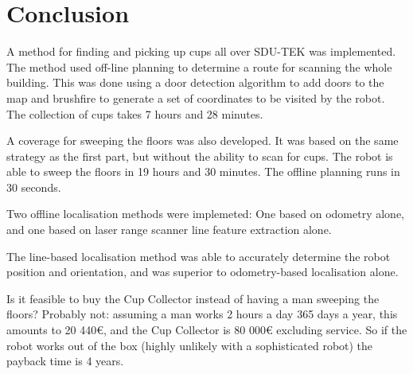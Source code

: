 \section{Conclusion}
\label{sec:conclusion}
A method for finding and picking up cups all over SDU-TEK was implemented. The method used off-line planning to determine a route for scanning the whole building. 
This was done using a door detection algorithm to add doors to the map and brushfire to generate a set of coordinates to be visited by the robot.
The collection of cups takes 7 hours and 28 minutes.

A coverage for sweeping the floors was also developed. It was based on the same strategy as the first part, but without the ability to scan for cups. The robot is able to sweep the floors in 19 hours and 30 minutes. The offline planning runs in 30 seconds. 

Two offline localisation methods were implemeted:
One based on odometry alone, and one based on laser range scanner line feature extraction alone.

The line-based localisation method was able to accurately determine the robot position and orientation,
and was superior to odometry-based localisation alone.

Is it feasible to buy the Cup Collector instead of having a man sweeping the floors?
Probably not: assuming a man works 2 hours a day 365 days a year, this amounts to 20 440\(\euro\),
and the Cup Collector is 80 000\(\euro\) excluding service.
So if the robot works out of the box (highly unlikely with a sophisticated robot) the payback time is 4 years.